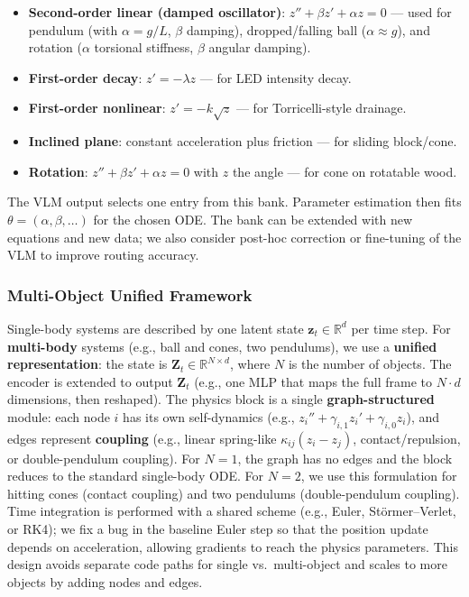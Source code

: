 \begin{itemize}[noitemsep]
  \item \textbf{Second-order linear (damped oscillator)}: $z'' + \beta z' + \alpha z = 0$ — used for pendulum (with $\alpha = g/L$, $\beta$ damping), dropped/falling ball ($\alpha \approx g$), and rotation ($\alpha$ torsional stiffness, $\beta$ angular damping).
  \item \textbf{First-order decay}: $z' = -\lambda z$ — for LED intensity decay.
  \item \textbf{First-order nonlinear}: $z' = -k\sqrt{z}$ — for Torricelli-style drainage.
  \item \textbf{Inclined plane}: constant acceleration plus friction — for sliding block/cone.
  \item \textbf{Rotation}: $z'' + \beta z' + \alpha z = 0$ with $z$ the angle — for cone on rotatable wood.
\end{itemize}

The VLM output selects one entry from this bank. Parameter estimation then fits $\theta = (\alpha, \beta, \ldots)$ for the chosen ODE. The bank can be extended with new equations and new data; we also consider post-hoc correction or fine-tuning of the VLM to improve routing accuracy.

\subsubsection{Multi-Object Unified Framework}
\label{sec:multi_object}

Single-body systems are described by one latent state $\mathbf{z}_t \in \mathbb{R}^d$ per time step. For \textbf{multi-body} systems (e.g., ball and cones, two pendulums), we use a \textbf{unified representation}: the state is $\mathbf{Z}_t \in \mathbb{R}^{N \times d}$, where $N$ is the number of objects. The encoder is extended to output $\mathbf{Z}_t$ (e.g., one MLP that maps the full frame to $N \cdot d$ dimensions, then reshaped). The physics block is a single \textbf{graph-structured} module: each node $i$ has its own self-dynamics (e.g., $z_i'' + \gamma_{i,1} z_i' + \gamma_{i,0} z_i$), and edges represent \textbf{coupling} (e.g., linear spring-like $\kappa_{ij}(z_i - z_j)$, contact/repulsion, or double-pendulum coupling). For $N=1$, the graph has no edges and the block reduces to the standard single-body ODE. For $N=2$, we use this formulation for hitting cones (contact coupling) and two pendulums (double-pendulum coupling). Time integration is performed with a shared scheme (e.g., Euler, Störmer--Verlet, or RK4); we fix a bug in the baseline Euler step so that the position update depends on acceleration, allowing gradients to reach the physics parameters. This design avoids separate code paths for single vs.\ multi-object and scales to more objects by adding nodes and edges.

